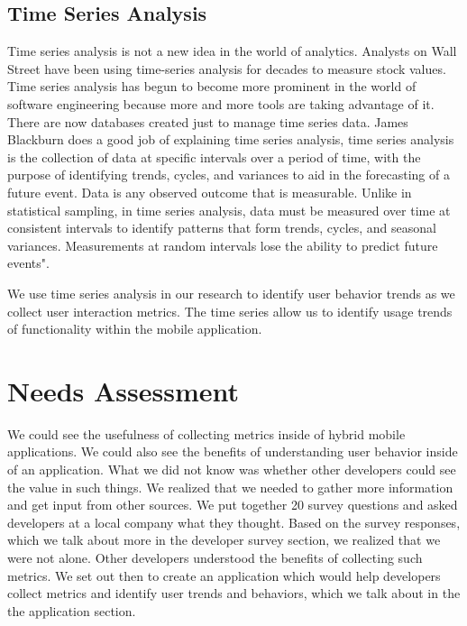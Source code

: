 \subsection{Time Series Analysis}
Time series analysis is not a new idea in the world of analytics. Analysts on Wall Street have been using time-series analysis for decades to measure stock values. Time series analysis has begun to become more prominent in the world of software engineering because more and more tools are taking advantage of it. There are now databases created just to manage time series data. James Blackburn does a good job of explaining time series analysis, time series analysis is the collection of data at specific intervals over a period of time, with the purpose of identifying trends, cycles, and variances to aid in the forecasting of a future event. Data is any observed outcome that is measurable. Unlike in statistical sampling, in time series analysis, data must be measured over time at consistent intervals to identify patterns that form trends, cycles, and seasonal variances. Measurements at random intervals lose the ability to predict future events"\cite{timeseries}.

We use time series analysis in our research to identify user behavior trends as we collect user interaction metrics. The time series allow us to identify usage trends of functionality within the mobile application. 

\section{Needs Assessment}
We could see the usefulness of collecting metrics inside of hybrid mobile applications. We could also see the benefits of understanding user behavior inside of an application. What we did not know was whether other developers could see the value in such things. We realized that we needed to gather more information and get input from other sources. We put together 20 survey questions and asked developers at a local company what they thought. Based on the survey responses, which we talk about more in the developer survey section, we realized that we were not alone. Other developers understood the benefits of collecting such metrics. We set out then to create an application which would help developers collect metrics and identify user trends and behaviors, which we talk about in the the application section.

